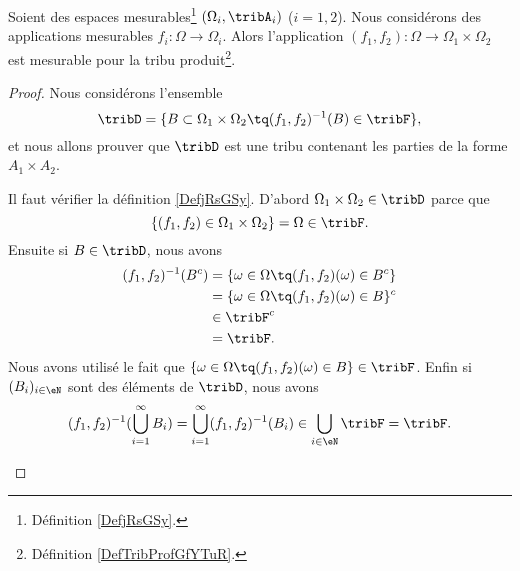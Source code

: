 \begin{proposition}	\label{PROPooSKIEooCpLVQT}
	Soient des espaces mesurables\footnote{Définition \ref{DefjRsGSy}.} \( (\Omega_i,\tribA_i)\) (\( i=1,2\)). Nous considérons des applications mesurables \(f_i \colon \Omega\to \Omega_i  \). Alors l'application \((f_1,f_2) \colon \Omega\to \Omega_1\times \Omega_2  \) est mesurable pour la tribu produit\footnote{Définition \ref{DefTribProfGfYTuR}.}.
\end{proposition}

\begin{proof}
	Nous considérons l'ensemble
	\begin{equation}
		\tribD=\{ B\subset \Omega_1\times \Omega_2\tq (f_1,f_2)^{-1}(B)\in \tribF \},
	\end{equation}
	et nous allons prouver que \( \tribD\) est une tribu contenant les parties de la forme \( A_1\times A_2\).

	\begin{subproof}
		Il faut vérifier la définition \ref{DefjRsGSy}. D'abord \( \Omega_1\times \Omega_2\in \tribD\) parce que
		\begin{equation}
			\{ (f_1,f_2)\in \Omega_1\times \Omega_2 \}=\Omega\in\tribF.
		\end{equation}
		Ensuite si \( B\in \tribD\), nous avons
		\begin{subequations}
			\begin{align}
				(f_1,f_2)^{-1}(B^c) & =\{ \omega\in \Omega\tq (f_1,f_2)(\omega)\in B^c \} \\
				                    & =\{ \omega\in \Omega\tq (f_1,f_2)(\omega)\in B \}^c \\
				                    & \in\tribF^c                                         \\
				                    & =\tribF.
			\end{align}
		\end{subequations}
		Nous avons utilisé le fait que \( \{ \omega\in \Omega\tq (f_1,f_2)(\omega)\in B \}\in \tribF\). Enfin si \( (B_i)_{i\in \eN}\) sont des éléments de \( \tribD\), nous avons
		\begin{equation}
			(f_1,f_2)^{-1}(\bigcup_{i=1}^{\infty}B_i)=\bigcup_{i=1}^{\infty}(f_1,f_2)^{-1}(B_i)\in\bigcup_{i\in \eN}\tribF=\tribF.
		\end{equation}


\end{subproof}
\end{proof}
